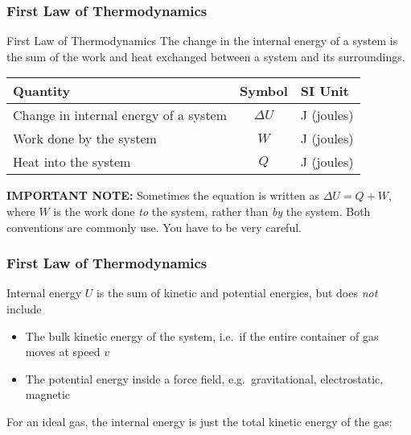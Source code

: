 \documentclass[12pt,aspectratio=169]{beamer}
\newcommand{\eq}[2]{\vspace{#1}{\Large\begin{displaymath}#2\end{displaymath}}}
\begin{document}
\begin{frame}
  \frametitle{First Law of Thermodynamics}
  \begin{block}{First Law of Thermodynamics}
    The change in the internal energy of a system is the sum of the work and
    heat exchanged between a system and its surroundings. 
  \end{block}
  
  \eq{-.2in}{
    \boxed{\Delta U=Q-W}
  }
  \begin{center}
    \begin{tabular}{l|c|l}
      \rowcolor{pink}
      \textbf{Quantity} & \textbf{Symbol} & \textbf{SI Unit} \\ \hline
      Change in internal energy of a system & $\Delta U$ & \si{J} (joules) \\
      Work done by the system      & $W$                 & \si{J} (joules) \\
      Heat into the system         & $Q$                 & \si{J} (joules)
    \end{tabular}
  \end{center}

  \textbf{IMPORTANT NOTE:} Sometimes the equation is written as
  $\Delta U=Q+W$, where $W$ is the work done \emph{to} the system, rather
  than \emph{by} the system. Both conventions are commonly use. You have to
  be very careful.
\end{frame}


\begin{frame}
  \frametitle{First Law of Thermodynamics}
  
  Internal energy $U$ is the sum of kinetic and potential energies, but does
  \emph{not} include
  \begin{itemize}
  \item The bulk kinetic energy of the system, i.e.\ if the entire container
    of gas moves at speed $v$
  \item The potential energy inside a force field, e.g.\ gravitational,
    electrostatic, magnetic
  \end{itemize}
  For an ideal gas, the internal energy is just the total kinetic energy of the
  gas:

  \eq{-.2in}{
    U=K=\frac{1}{2}NkT=\frac{1}{2}nRT
  }
\end{frame}
\end{document}
